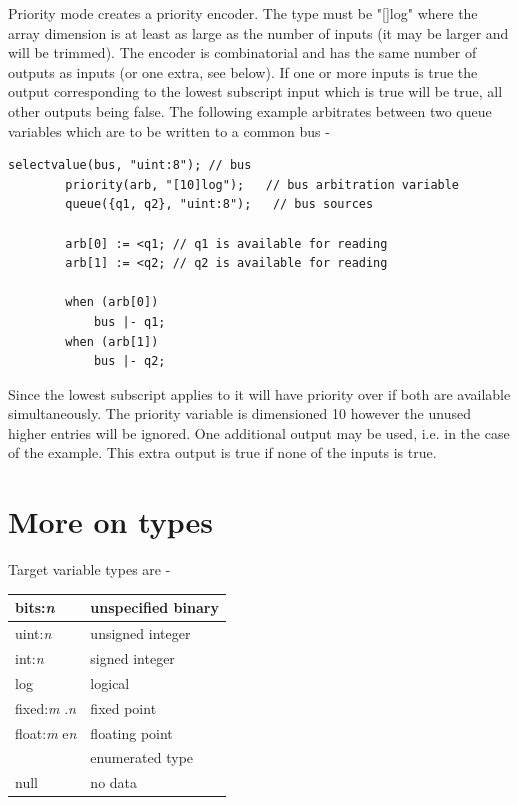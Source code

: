        Priority mode creates a priority encoder. The type must be "[]log" where the
        array dimension is at least as large as the number of inputs (it may be larger
        and will be trimmed). The encoder is combinatorial and has the same number of
        outputs as inputs (or one extra, see below). If one or more inputs is true the
        output corresponding to the lowest subscript input which is true will be true,
        all other outputs being false. The following example arbitrates between two
        queue variables which are to be written to a common bus -
        \begin{lstlisting}[language=threepl]
        selectvalue(bus, "uint:8"); // bus
        priority(arb, "[10]log");   // bus arbitration variable
        queue({q1, q2}, "uint:8");   // bus sources

        arb[0] := <q1; // q1 is available for reading
        arb[1] := <q2; // q2 is available for reading

        when (arb[0])
            bus |- q1;
        when (arb[1])
            bus |- q2;
        \end{lstlisting}
        Since the lowest subscript applies to  it will have priority
        over  if both are available simultaneously. The priority
        variable is dimensioned 10 however the unused higher entries will be
        ignored. One additional output may be used, i.e.  in the case of
        the example. This extra output is true if none of the inputs is true.


    \pagebreak
    \section{More on types}

        Target variable types are -

        \begin{tabular}{| l | l |}
        \hline
        bits:{\em n}           & unspecified binary                 \\ \hline
        uint:{\em n}           & unsigned integer                   \\ \hline
        int:{\em n}            & signed integer                     \\ \hline
        log                    & logical                            \\ \hline
        fixed:{\em m} .{\em n} & fixed point                        \\ \hline
        float:{\em m} e{\em n} & floating point                     \\ \hline
                               & enumerated type                    \\ \hline
        null                   & no data                            \\ \hline
        \end{tabular}

